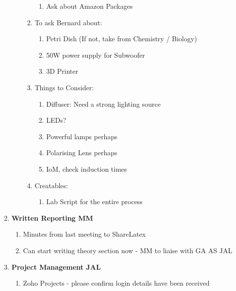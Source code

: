 \begin{enumerate}
\begin{enumerate}
\begin{enumerate}
\begin{enumerate}
\item  Ask about Amazon Packages
\end{enumerate}

\item  To ask Bernard about: 

\begin{enumerate}
\item  Petri Dish (If not, take from Chemistry / Biology)

\item  50W power supply for Subwoofer

\item  3D Printer
\end{enumerate}

\item  Things to Consider: 

\begin{enumerate}
\item  Diffuser: Need a strong lighting source

\item  LEDs?

\item  Powerful lamps perhaps

\item  Polarising Lens perhaps

\item  IoM, check induction times
\end{enumerate}

\item  Creatables: 

\begin{enumerate}
\item  Lab Script for the entire process\\
\end{enumerate}
\end{enumerate}
\end{enumerate}


\noindent 

\item  \textbf{Written Reporting MM}

\begin{enumerate}
\item Minutes from last meeting to ShareLatex

\item  Can start writing theory section now - MM to liaise with GA AS JAL\\
\end{enumerate}

\item  \textbf{Project Management JAL}

\begin{enumerate}
\item Zoho Projects - please confirm login details have been received
\end{enumerate}
\end{enumerate}